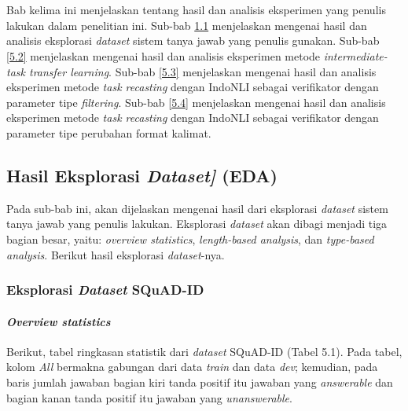\chapter{\babLima}
\label{bab:5}
Bab kelima ini menjelaskan tentang hasil dan analisis eksperimen yang penulis lakukan dalam penelitian ini. Sub-bab \ref{5.1} menjelaskan mengenai hasil dan analisis eksplorasi \emph{dataset} sistem tanya jawab yang penulis gunakan. Sub-bab \ref{5.2} menjelaskan mengenai hasil dan analisis eksperimen metode \emph{intermediate-task transfer learning}. Sub-bab \ref{5.3} menjelaskan mengenai hasil dan analisis eksperimen metode \emph{task recasting} dengan IndoNLI sebagai verifikator dengan parameter tipe \emph{filtering}. Sub-bab \ref{5.4} menjelaskan mengenai hasil dan analisis eksperimen metode \emph{task recasting} dengan IndoNLI sebagai verifikator dengan parameter tipe perubahan format kalimat.

\section{Hasil Eksplorasi \emph{Dataset]} (EDA)}
\label{5.1}
Pada sub-bab ini, akan dijelaskan mengenai hasil dari eksplorasi \emph{dataset} sistem tanya jawab yang penulis lakukan. Eksplorasi \emph{dataset} akan dibagi menjadi tiga bagian besar, yaitu: \emph{overview statistics}, \emph{length-based analysis}, dan \emph{type-based analysis}. Berikut hasil eksplorasi \emph{dataset}-nya.

\subsection{Eksplorasi \emph{Dataset} SQuAD-ID}

\subsubsection{\emph{Overview statistics}}
Berikut, tabel ringkasan statistik dari \emph{dataset} SQuAD-ID (Tabel 5.1). Pada tabel, kolom \emph{All} bermakna gabungan dari data \emph{train} dan data \emph{dev}; kemudian, pada baris jumlah jawaban bagian kiri tanda positif itu jawaban yang \emph{answerable} dan bagian kanan tanda positif itu jawaban yang \emph{unanswerable}.


